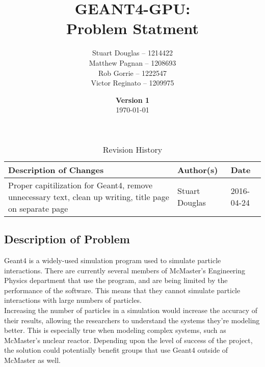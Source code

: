 \documentclass[12pt]{article}
\begin{document}
\title{
\LARGE GEANT4-GPU:
\\\vspace{10mm}
\large \textbf{Problem Statment}
\vspace{40mm}
}
\author{
Stuart Douglas -- 1214422
\\Matthew Pagnan -- 1208693
\\Rob Gorrie -- 1222547
\\Victor Reginato -- 1209975
\vspace{10mm}
}
\date{\vfill \textbf{Version 1}\\ \today}
\maketitle
\newpage

\begin{table}[h]
\centering
\caption{Revision History}
\begin{tabular}{p{9cm}ll}
\toprule
\textbf{Description of Changes} & \textbf{Author(s)} & \textbf{Date}\\\midrule
Proper capitilization for Geant4, remove unnecessary text, clean up writing, title page on separate page & Stuart Douglas & 2016-04-24\\\bottomrule
\end{tabular}
\end{table}

\subsection*{Description of Problem}
Geant4 is a widely-used simulation
program used to simulate particle interactions. There are currently several
members of McMaster's Engineering Physics department that use the program, and
are being limited by the performance of the software. This means that they
cannot simulate particle interactions with large numbers of particles.\\

\noindent Increasing the number of particles in a simulation 
would increase the accuracy of their results, allowing the researchers
to understand the systems they're modeling better. This is especially true when
modeling complex systems, such as McMaster's nuclear reactor. Depending upon the
level of success of the project, the solution could potentially benefit groups
that use Geant4 outside of McMaster as well.\\
\end{document}
